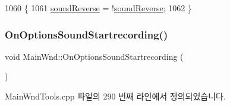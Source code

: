 \begin{DoxyCode}
1060 \{
1061   \mbox{\hyperlink{gb_sound_8cpp_a34a44cbcbdf585c7e2f1e17948600c1f}{soundReverse}} = !\mbox{\hyperlink{gb_sound_8cpp_a34a44cbcbdf585c7e2f1e17948600c1f}{soundReverse}};
1062 \}
\end{DoxyCode}
\mbox{\label{class_main_wnd_a61b3657a1df45da0e444c99fa5b298c5}} 
\subsubsection{\texorpdfstring{On\+Options\+Sound\+Startrecording()}{OnOptionsSoundStartrecording()}}
{\footnotesize\ttfamily void Main\+Wnd\+::\+On\+Options\+Sound\+Startrecording (\begin{DoxyParamCaption}{ }\end{DoxyParamCaption})\hspace{0.3cm}{\ttfamily [protected]}}



Main\+Wnd\+Tools.\+cpp 파일의 290 번째 라인에서 정의되었습니다.


